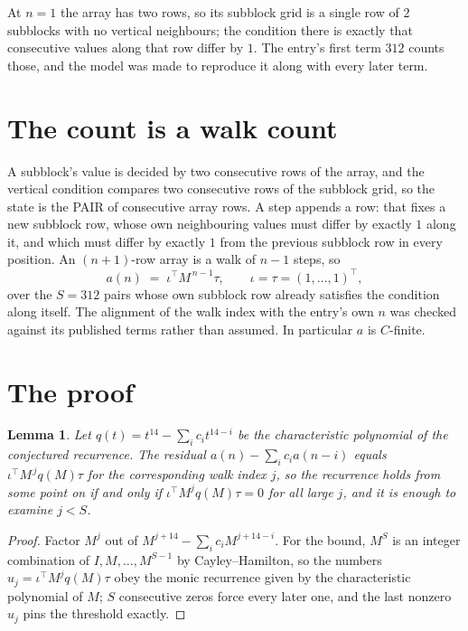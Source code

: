 \documentclass[11pt,a4paper]{article}
\theoremstyle{plain}
\newtheorem{lemma}[theorem]{Lemma}
\theoremstyle{definition}
\begin{document}
At $n=1$ the array has two rows, so its subblock grid is a single row of $2$ subblocks with
no vertical neighbours; the condition there is exactly that consecutive values along that row
differ by $1$. The entry's first term $312$ counts those, and the model was made to
reproduce it along with every later term.

\section{The count is a walk count}

A subblock's value is decided by two consecutive rows of the array, and the
vertical condition compares two consecutive rows of the subblock grid, so the state is the
PAIR of consecutive array rows. A step appends a row: that fixes a new subblock row, whose own
neighbouring values must differ by exactly $1$ along it, and which must differ by exactly
$1$ from the previous subblock row in every position. An $(n+1)$-row array is a walk of
$n-1$ steps, so
\[
a(n)\;=\;\iota^{\!\top}M^{\,n-1}\tau,\qquad\iota=\tau=(1,\dots,1)^{\!\top},
\]
over the $S=312$ pairs whose own subblock row already satisfies the condition along itself.
The alignment of the walk index with the entry's own $n$ was checked against its published
terms rather than assumed. In particular $a$ is $C$-finite.

\section{The proof}

\begin{lemma}\label{lem:crit}
Let $q(t)=t^{14}-\sum_i c_it^{14-i}$ be the characteristic polynomial of the
conjectured recurrence. The residual $a(n)-\sum_ic_ia(n-i)$ equals
$\iota^{\!\top}M^{\,j}q(M)\tau$ for the corresponding walk index $j$, so the recurrence
holds from some point on if and only if $\iota^{\!\top}M^{j}q(M)\tau=0$ for all large $j$,
and it is enough to examine $j<S$.
\end{lemma}

\begin{proof}
Factor $M^{j}$ out of $M^{j+14}-\sum_ic_iM^{j+14-i}$. For the bound, $M^{S}$
is an integer combination of $I,M,\dots,M^{S-1}$ by Cayley--Hamilton, so the numbers
$u_j=\iota^{\!\top}M^{j}q(M)\tau$ obey the monic recurrence given by the characteristic
polynomial of $M$; $S$ consecutive zeros force every later one, and the last nonzero $u_j$
pins the threshold exactly.
\end{proof}
\end{document}
